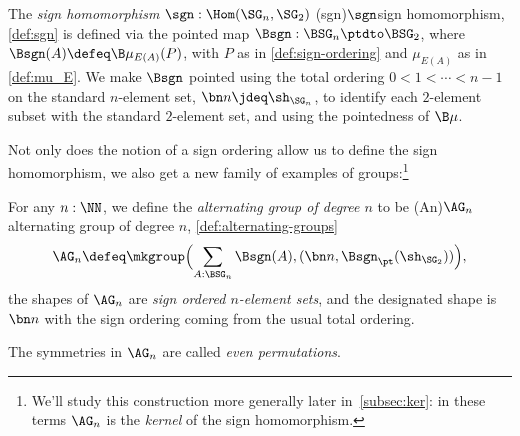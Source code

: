 \begin{definition}\label{def:sgn}
  The \emph{sign homomorphism} $\sgn : \Hom(\SG_n,\SG_2)$%
  \glossary(sgn){$\protect\sgn$}{sign homomorphism, \cref{def:sgn}}
  is defined via the pointed map $\Bsgn : \BSG_n \ptdto \BSG_2$,
  where $\Bsgn(A) \defeq \B\mu_{E(A)}(P)$, with $P$ as in
  \cref{def:sign-ordering} and $\mu_{E(A)}$ as in \cref{def:mu_E}.
  We make $\Bsgn$ pointed using the total ordering 
  $0 < 1 < \cdots < n-1$ on the standard $n$-element set, 
  $\bn n \jdeq \sh_{\SG_n}$, to identify each $2$-element 
  subset with the standard $2$-element set,
  and using the pointedness of $\B\mu$.
\end{definition}
Not only does the notion of a sign ordering allow us to define the
sign homomorphism, we also get a new family of examples of groups:\footnote{%
  We'll study this construction more generally later in~\cref{subsec:ker}:
  in these terms $\AG_n$ is the \emph{kernel} of the sign homomorphism.}
\begin{definition}\label{def:alternating-groups}
  For any $n:\NN$, we define the \emph{alternating group of degree $n$}
  to be%
  \glossary(An){$\protect\AG_n$}{alternating group of degree $n$,
      \cref{def:alternating-groups}}
  \[
    \AG_n \defeq \mkgroup\Bigl(\sum_{A:\BSG_n}\Bsgn(A),
      (\bn n, \Bsgn_\pt(\sh_{\SG_2}))\Bigr),
  \]
  \ie the shapes of $\AG_n$ are \emph{sign ordered $n$-element sets},
  and the designated shape is $\bn n$ with the sign ordering coming
  from the usual total ordering.

  The symmetries in $\AG_n$ are called \emph{even permutations}.%
\end{definition}

